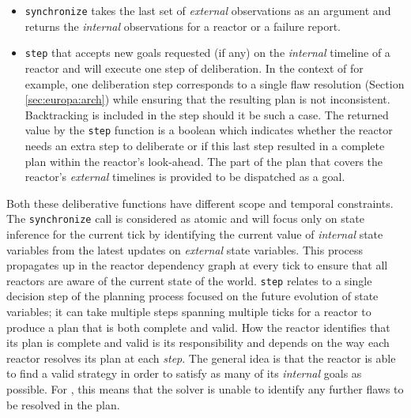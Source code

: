 \begin{itemize}

\item \texttt{synchronize} takes the last set of {\em external}
  observations as an argument and returns the {\em internal}
  observations for a reactor or a failure report.

\item \texttt{step} that accepts new goals requested (if any) on the
  {\em internal} timeline of a reactor and will execute one step of
  deliberation. In the context of \eu for example, one deliberation
  step corresponds to a single flaw resolution (Section
  \ref{sec:europa:arch}) while ensuring that the resulting plan is not
  inconsistent. Backtracking is included in the step should it be such
  a case.  The returned value by the \texttt{step} function is a
  boolean which indicates whether the reactor needs an extra step to
  deliberate or if this last step resulted in a complete plan within
  the reactor's look-ahead. The part of the plan that covers the
  reactor's {\em external} timelines is provided to be dispatched as a
  goal.

\end{itemize}

Both these deliberative  functions have different scope and
temporal constraints. The \texttt{synchronize} call is considered as
atomic and will focus only on state inference for the current tick by
identifying the current value of {\em internal} state variables from
the latest updates on {\em external} state variables. This process
propagates up in the reactor dependency graph at every tick to ensure
that all reactors are aware of the current state of the
world. \texttt{step} relates to a single decision step of the planning
process focused on the future evolution of state variables; it can
take multiple steps spanning multiple ticks for a reactor to produce a
plan that is both complete and valid. How the reactor identifies that
its plan is complete and valid is its responsibility and depends on
the way each reactor resolves its plan at each {\em step}. The general
idea is that the reactor is able to find a valid strategy in order to
satisfy as many of its {\em internal} goals as possible. For \eu, this
means that the solver is unable to identify any further flaws to be
resolved in the plan.

